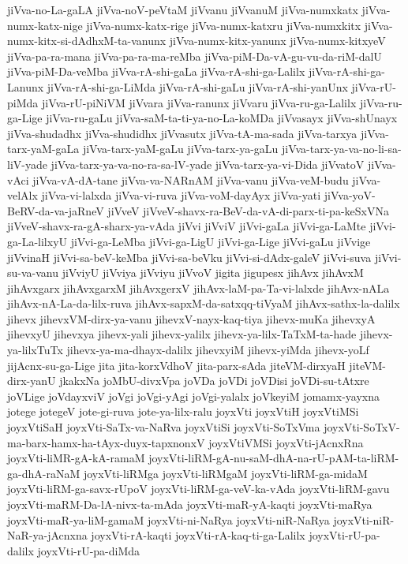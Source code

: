 {jiVva-no-La-gaLA
jiVva-noV-peVtaM
jiVvanu
jiVvanuM
jiVva-numxkatx
jiVva-numx-katx-nige
jiVva-numx-katx-rige
jiVva-numx-katxru
jiVva-numxkitx
jiVva-numx-kitx-si-dAdhxM-ta-vanunx
jiVva-numx-kitx-yanunx
jiVva-numx-kitxyeV
jiVva-pa-ra-mana
jiVva-pa-ra-ma-reMba
jiVva-piM-Da-vA-gu-vu-da-riM-dalU
jiVva-piM-Da-veMba
jiVva-rA-shi-gaLa
jiVva-rA-shi-ga-Lalilx
jiVva-rA-shi-ga-Lanunx
jiVva-rA-shi-ga-LiMda
jiVva-rA-shi-gaLu
jiVva-rA-shi-yanUnx
jiVva-rU-piMda
jiVva-rU-piNiVM
jiVvara
jiVva-ranunx
jiVvaru
jiVva-ru-ga-Lalilx
jiVva-ru-ga-Lige
jiVva-ru-gaLu
jiVva-saM-ta-ti-ya-no-La-koMDa
jiVvasayx
jiVva-shUnayx
jiVva-shudadhx
jiVva-shudidhx
jiVvasutx
jiVva-tA-ma-sada
jiVva-tarxya
jiVva-tarx-yaM-gaLa
jiVva-tarx-yaM-gaLu
jiVva-tarx-ya-gaLu
jiVva-tarx-ya-va-no-li-sa-liV-yade
jiVva-tarx-ya-va-no-ra-sa-lV-yade
jiVva-tarx-ya-vi-Dida
jiVvatoV
jiVva-vAci
jiVva-vA-dA-tane
jiVva-va-NARnAM
jiVva-vanu
jiVva-veM-budu
jiVva-velAlx
jiVva-vi-lalxda
jiVva-vi-ruva
jiVva-voM-dayAyx
jiVva-yati
jiVva-yoV-BeRV-da-va-jaRneV
jiVveV
jiVveV-shavx-ra-BeV-da-vA-di-parx-ti-pa-keSxVNa
jiVveV-shavx-ra-gA-sharx-ya-vAda
jiVvi
jiVviV
jiVvi-gaLa
jiVvi-ga-LaMte
jiVvi-ga-La-lilxyU
jiVvi-ga-LeMba
jiVvi-ga-LigU
jiVvi-ga-Lige
jiVvi-gaLu
jiVvige
jiVvinaH
jiVvi-sa-beV-keMba
jiVvi-sa-beVku
jiVvi-si-dAdx-galeV
jiVvi-suva
jiVvi-su-va-vanu
jiVviyU
jiVviya
jiVviyu
jiVvoV
jigita
jigupesx
jihAvx
jihAvxM
jihAvxgarx
jihAvxgarxM
jihAvxgerxV
jihAvx-laM-pa-Ta-vi-lalxde
jihAvx-nALa
jihAvx-nA-La-da-lilx-ruva
jihAvx-sapxM-da-satxqq-tiVyaM
jihAvx-sathx-la-dalilx
jihevx
jihevxVM-dirx-ya-vanu
jihevxV-nayx-kaq-tiya
jihevx-muKa
jihevxyA
jihevxyU
jihevxya
jihevx-yali
jihevx-yalilx
jihevx-ya-lilx-TaTxM-ta-hade
jihevx-ya-lilxTuTx
jihevx-ya-ma-dhayx-dalilx
jihevxyiM
jihevx-yiMda
jihevx-yoLf
jijAcnx-su-ga-Lige
jita
jita-korxVdhoV
jita-parx-sAda
jiteVM-dirxyaH
jiteVM-dirx-yanU
jkakxNa
joMbU-divxVpa
joVDa
joVDi
joVDisi
joVDi-su-tAtxre
joVLige
joVdayxviV
joVgi
joVgi-yAgi
joVgi-yalalx
joVkeyiM
jomamx-yayxna
jotege
jotegeV
jote-gi-ruva
jote-ya-lilx-ralu
joyxVti
joyxVtiH
joyxVtiMSi
joyxVtiSaH
joyxVti-SaTx-va-NaRva
joyxVtiSi
joyxVti-SoTxVma
joyxVti-SoTxV-ma-barx-hamx-ha-tAyx-duyx-tapxnonxV
joyxVtiVMSi
joyxVti-jAcnxRna
joyxVti-liMR-gA-kA-ramaM
joyxVti-liRM-gA-nu-saM-dhA-na-rU-pAM-ta-liRM-ga-dhA-raNaM
joyxVti-liRMga
joyxVti-liRMgaM
joyxVti-liRM-ga-midaM
joyxVti-liRM-ga-savx-rUpoV
joyxVti-liRM-ga-veV-ka-vAda
joyxVti-liRM-gavu
joyxVti-maRM-Da-lA-nivx-ta-mAda
joyxVti-maR-yA-kaqti
joyxVti-maRya
joyxVti-maR-ya-liM-gamaM
joyxVti-ni-NaRya
joyxVti-niR-NaRya
joyxVti-niR-NaR-ya-jAcnxna
joyxVti-rA-kaqti
joyxVti-rA-kaq-ti-ga-Lalilx
joyxVti-rU-pa-dalilx
joyxVti-rU-pa-diMda
}
